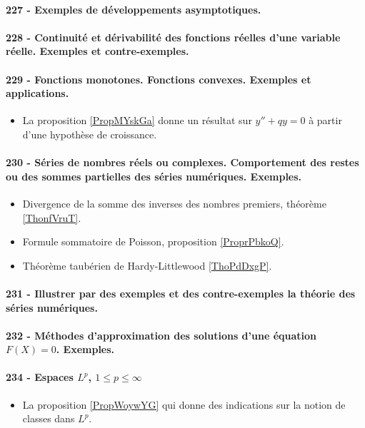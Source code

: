 \paragraph{227 - Exemples de développements asymptotiques.}
\paragraph{228 - Continuité et dérivabilité des fonctions réelles d’une variable réelle. Exemples et contre-exemples.}
\paragraph{229 - Fonctions monotones. Fonctions convexes. Exemples et applications.}
\begin{itemize}
    \item La proposition \ref{PropMYskGa} donne un résultat sur \( y''+qy=0\) à partir d'une hypothèse de croissance.
\end{itemize}
\paragraph{230 - Séries de nombres réels ou complexes. Comportement des restes ou des sommes partielles des séries numériques. Exemples.}
\begin{itemize}
    \item Divergence de la somme des inverses des nombres premiers, théorème \ref{ThonfVruT}.
    \item Formule sommatoire de Poisson, proposition \ref{ProprPbkoQ}.
    \item Théorème taubérien de Hardy-Littlewood \ref{ThoPdDxgP}.
\end{itemize}
\paragraph{231 - Illustrer par des exemples et des contre-exemples la théorie des séries numériques.}
\paragraph{232 - Méthodes d’approximation des solutions d’une équation $F (X ) = 0$. Exemples.}
\paragraph{234 - Espaces \( L^p\), \( 1\leq p\leq\infty\)}
\begin{itemize}
    \item La proposition \ref{PropWoywYG} qui donne des indications sur la notion de classes dans \( L^p\).
\end{itemize}
